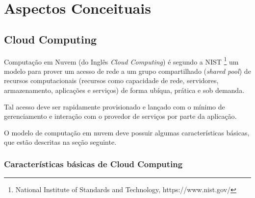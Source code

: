 \documentclass[twosideprint]{politex}
\begin{document}
\chapter{Aspectos Conceituais}
	\section{Cloud Computing}
	Computação em Nuvem (do Inglês \textit{Cloud Computing}) é segundo a NIST \footnote{National Institute of Standards and Technology, https://www.nist.gov/} um modelo para prover um acesso de rede a um grupo compartilhado (\textit{shared pool}) de recursos computacionais (recursos como capacidade de rede, servidores, armazenamento, aplicações e serviços) de forma ubíqua, prática e sob demanda.

Tal acesso deve ser rapidamente provisionado e lançado com o mínimo de gerenciamento e interação com o provedor de serviços por parte da aplicação.

O modelo de computação em nuvem deve possuir algumas características básicas, que estão descritas na seção seguinte.

\subsection{Características básicas de Cloud Computing}
\end{document}
